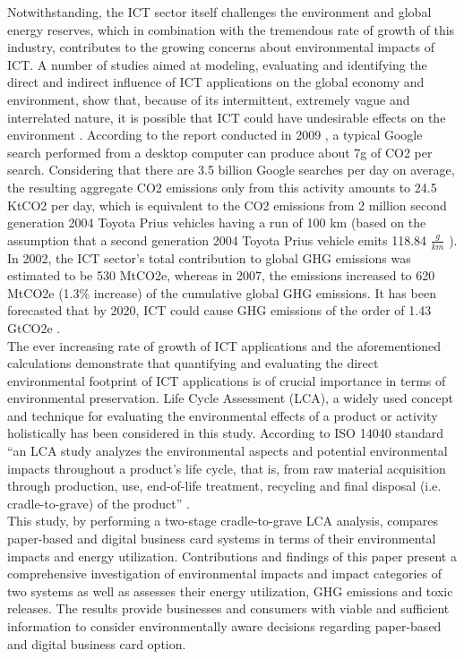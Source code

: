 \documentclass[3p,times,procedia]{elsarticle}
\begin{document}
Notwithstanding, the ICT sector itself challenges the environment and global energy reserves, which in combination with the tremendous rate of growth of this industry, contributes to the growing concerns about environmental impacts of ICT. A number of studies aimed at modeling, evaluating and identifying the direct and indirect influence of ICT applications on the global economy and environment, show that, because of its intermittent, extremely vague and interrelated nature, it is possible that ICT could have undesirable effects on the environment  \cite{Hilty20061618, 6083606, Bull201410}. According to the report conducted in 2009 \cite{7282419}, a typical Google search performed from a desktop computer can produce about 7g of CO2 per search. Considering that there are 3.5 billion Google searches per day on average, the resulting aggregate CO2 emissions only from this activity amounts to 24.5 KtCO2 per day, which is equivalent to the CO2 emissions from 2 million second generation 2004 Toyota Prius vehicles having a run of 100 km (based on the assumption that a second generation 2004 Toyota Prius vehicle emits 118.84 $\frac{g}{km}$ \cite{6728838}). In 2002, the ICT sector's total contribution to global GHG emissions was estimated to be 530 MtCO2e, whereas in 2007, the emissions increased to 620 MtCO2e (1.3\% increase) of the cumulative global GHG emissions. It has been forecasted that by 2020, ICT could cause GHG emissions of the order of 1.43 GtCO2e  \cite{malmodin2013future, s3758490}.\\

The ever increasing rate of growth of ICT applications and the aforementioned calculations demonstrate that quantifying and evaluating the direct environmental footprint of ICT applications is of crucial importance in terms of environmental preservation. Life Cycle Assessment (LCA), a widely used concept and technique for evaluating the environmental effects of a product or activity holistically has been considered in this study. According to ISO 14040 standard ``an LCA study analyzes the environmental aspects and potential environmental impacts throughout a product's life cycle, that is, from raw material acquisition through production, use, end-of-life treatment, recycling and final disposal (i.e. cradle-to-grave) of the product'' \cite{ISO140402006}.\\

This study, by performing a two-stage cradle-to-grave LCA analysis, compares paper-based and digital business card systems in terms of their environmental impacts and energy utilization. Contributions and findings of this paper present a comprehensive investigation of environmental impacts and impact categories of two systems as well as assesses their energy utilization, GHG emissions and toxic releases. The results provide businesses and consumers with viable and sufficient information to consider environmentally aware decisions regarding paper-based and digital business card option.
\end{document}
